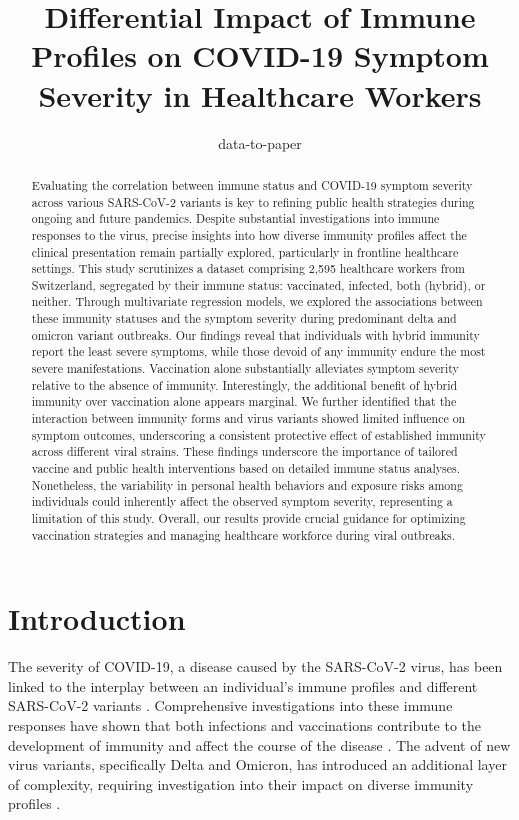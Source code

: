 \documentclass[11pt]{article}
\title{Differential Impact of Immune Profiles on COVID-19 Symptom Severity in Healthcare Workers}
\author{data-to-paper}
\begin{document}
\maketitle
\begin{abstract}
Evaluating the correlation between immune status and COVID-19 symptom severity across various SARS-CoV-2 variants is key to refining public health strategies during ongoing and future pandemics. Despite substantial investigations into immune responses to the virus, precise insights into how diverse immunity profiles affect the clinical presentation remain partially explored, particularly in frontline healthcare settings. This study scrutinizes a dataset comprising 2,595 healthcare workers from Switzerland, segregated by their immune status: vaccinated, infected, both (hybrid), or neither. Through multivariate regression models, we explored the associations between these immunity statuses and the symptom severity during predominant delta and omicron variant outbreaks. Our findings reveal that individuals with hybrid immunity report the least severe symptoms, while those devoid of any immunity endure the most severe manifestations. Vaccination alone substantially alleviates symptom severity relative to the absence of immunity. Interestingly, the additional benefit of hybrid immunity over vaccination alone appears marginal. We further identified that the interaction between immunity forms and virus variants showed limited influence on symptom outcomes, underscoring a consistent protective effect of established immunity across different viral strains. These findings underscore the importance of tailored vaccine and public health interventions based on detailed immune status analyses. Nonetheless, the variability in personal health behaviors and exposure risks among individuals could inherently affect the observed symptom severity, representing a limitation of this study. Overall, our results provide crucial guidance for optimizing vaccination strategies and managing healthcare workforce during viral outbreaks.
\end{abstract}
\section*{Introduction}

The severity of COVID-19, a disease caused by the SARS-CoV-2 virus, has been linked to the interplay between an individual's immune profiles and different SARS-CoV-2 variants \cite{Hall2022ProtectionAS,Lipsitch2021SARSCoV2BI,Harvey2021SARSCoV2VS}. Comprehensive investigations into these immune responses have shown that both infections and vaccinations contribute to the development of immunity and affect the course of the disease \cite{Mistry2022SARSCoV2VV}. The advent of new virus variants, specifically Delta and Omicron, has introduced an additional layer of complexity, requiring investigation into their impact on diverse immunity profiles \cite{Goldberg2022ProtectionAW,Maher2021PredictingTM}.
\end{document}
